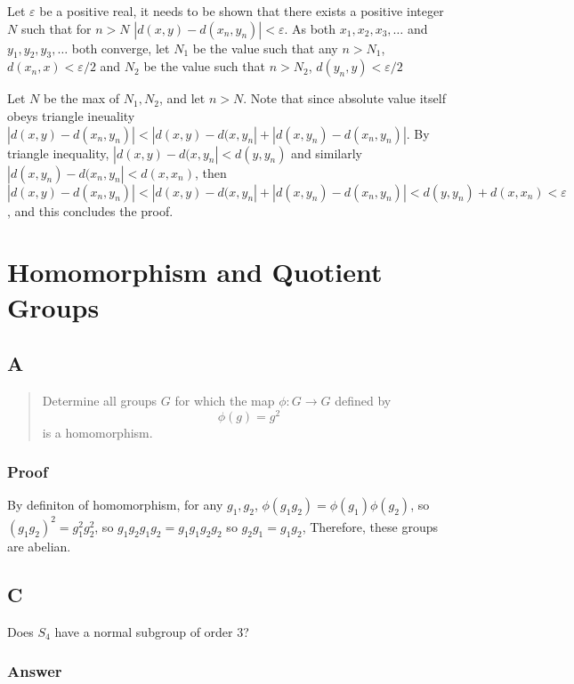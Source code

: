 \documentclass[11pt]{article}
\begin{document}
Let \(\varepsilon\) be a positive real, it needs to be shown that there exists a
positive integer \(N\) such that for \(n > N\) \(|d(x, y) - d(x_n, y_{n})| < \varepsilon\).
As both \(x_1, x_2, x_3, \ldots\) and \(y_1, y_2, y_3,
\ldots\) both converge, let \(N_{1}\) be the value such that any \(n > N_1\),
\(d(x_n, x) < \varepsilon / 2\) and \(N_2\) be the value such that  \(n > N_2\),
\(d(y_n, y) < \varepsilon / 2\)


Let \(N\) be the max of \(N_1, N_2\), and let \(n > N\). Note that since absolute value itself obeys
triangle ineuality \(|d(x, y) - d(x_n, y_{n})| < |d(x,y) - d(x, y_{n}| + |d(x,
y_n) - d(x_n, y_n)|\). By triangle inequality, \(|d(x,y) - d(x, y_{n}| < d(y,
y_n)\) and similarly \(|d(x,y_{n}) - d(x_n, y_{n}| < d(x,
x_n)\), then \(|d(x, y) - d(x_n, y_{n})| < |d(x,y) - d(x, y_{n}| + |d(x,
y_n) - d(x_n, y_n)| < d(y,
y_n) + d(x,
x_n) < \varepsilon\), and this concludes the proof.



\section{Homomorphism and Quotient Groups}
\label{sec:orgf976c45}
\subsection{A}
\label{sec:orgb86b967}

\begin{quote}
Determine all groups \(G\) for which the map \(\phi : G \rightarrow G\) defined by
\begin{equation}
\label{eq:1}
\phi(g) = g^{2}
\end{equation}
is a homomorphism.
\end{quote}
\subsubsection{Proof}
\label{sec:org1bd3447}
By definiton of homomorphism, for any \(g_1, g_2\), \(\phi(g_1 g_2) =
\phi(g_{1}) \phi(g_{2})\), so \((g_1 g_{2})^{2}  =
g_{1}^{2} g_{2}^{2}\), so \(g_1 g_2 g_1 g_2 = g_1 g_1 g_2 g_2\) so \(g_2 g_1 =
g_1 g_2\), Therefore, these groups are abelian.
\subsection{C}
\label{sec:org9234d86}


Does \(S_4\) have a normal subgroup of order 3?
\subsubsection{Answer}
\label{sec:org8070691}
\end{document}
